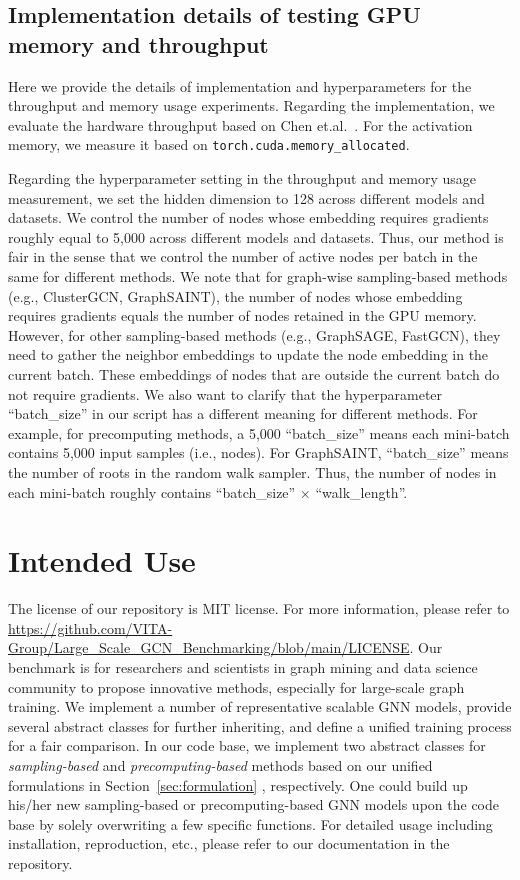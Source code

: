 \message{ !name(main.tex)}\documentclass{article}
\begin{document}
\vspace{-3mm}
\subsection{Implementation details of testing GPU memory and throughput}\label{app:implementation_details_speed_and_mem}

Here we provide the details of implementation and hyperparameters for the throughput and memory usage experiments.
Regarding the implementation,
we evaluate the hardware throughput based on Chen et.al.~\citep{chen2021actnn}.
For the activation memory, we measure it based on \texttt{torch.cuda.memory\_allocated}.

Regarding the hyperparameter setting in the throughput and memory usage measurement,
we set the hidden dimension to 128 across different models and datasets.
We control the number of nodes whose embedding requires gradients roughly equal to 5,000 across different models and datasets.
Thus, our method is fair in the sense that we control the number of active nodes per batch in the same for different methods.
We note that for graph-wise sampling-based methods (e.g., ClusterGCN, GraphSAINT),  the number of nodes whose embedding requires gradients equals the number of nodes retained in the GPU memory.
However, for other sampling-based methods (e.g., GraphSAGE, FastGCN), they need to gather the neighbor embeddings to update the node embedding in the current batch.
These embeddings of nodes that are outside the current batch do not require gradients.
We also want to clarify that the hyperparameter ``batch\_size'' in our script has a different meaning for different methods.
For example, for precomputing methods, a 5,000 ``batch\_size'' means each mini-batch contains 5,000 input samples (i.e., nodes).
For GraphSAINT, ``batch\_size'' means the number of roots in the random walk sampler.
Thus, the number of nodes in each mini-batch roughly contains ``batch\_size'' $\times$ ``walk\_length''.

\vspace{-4mm}
\section{Intended Use}
\vspace{-2mm}
The license of our repository is MIT license. For more information, please refer to \url{https://github.com/VITA-Group/Large_Scale_GCN_Benchmarking/blob/main/LICENSE}. Our benchmark is for researchers and scientists in graph mining and data science community to propose innovative methods, especially for large-scale graph training. We implement a number of representative scalable GNN models, provide several abstract classes for further inheriting, and define a unified training process for a fair comparison.
In our code base, we implement two abstract classes for \textit{sampling-based} and \textit{precomputing-based} methods based on our unified formulations in Section~\ref{sec:formulation} , respectively. One could build up his/her new sampling-based or precomputing-based GNN models upon the code base by solely overwriting a few specific functions. For detailed usage including installation, reproduction, etc., please refer to our documentation in the repository.
 
\end{document}
